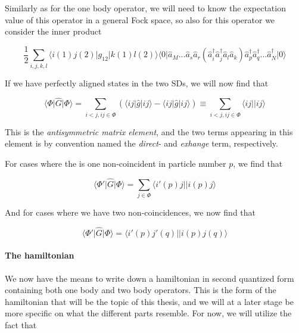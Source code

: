 Similarly as for the one body operator, we will need to know the expectation value of this operator in a general Fock space, so also for this operator we consider the inner product

\begin{equation}
 \frac{1}{2} \sum_{i,j,k,l}    \langle i(1) j(2) \vert g_{12} \vert k(1) l(2) \rangle \langle 0\vert  \hat{a}_M ...  \hat{a}_s  \hat{a}_r (\hat{a}_{i}^{\dagger}\hat{a}_{j}^{\dagger} \hat{a}_{l} \hat{a}_k)  \hat{a}_p^\dagger \hat{a}_q^\dagger  ... \hat{a}_N^\dagger \vert 0 \rangle
\label{eqn:sd12inner_op2}
\end{equation}

If we have perfectly aligned states in the two SDs, we will now find that

\begin{equation}
\langle \Phi \vert \hat{G} \vert \Phi \rangle = \sum_{i < j, ij \in \Phi} (\langle ij \vert \hat{g} \vert ij \rangle -   \langle ij \vert \hat{g} \vert ij \rangle) \equiv \sum_{i < j, ij \in \Phi}  \langle ij \vert \vert ij \rangle
\label{eqn:antisymmetric_element}
\end{equation}

This is the \emph{antisymmetric matrix element}, and the two terms appearing in this element is by convention named the \emph{direct}- and \emph{exhange} term, respectively. 

For cases where the is one non-coincident in particle number $p$, we find that

\begin{equation}
\langle \Phi' \vert \hat{G} \vert \Phi \rangle = \sum_{j \in \Phi} \langle i'(p) j \vert \vert i(p)j \rangle
\label{eqn:antisymmetric_element_2}
\end{equation}

And for cases where we have two non-coincidences, we now find that

\begin{equation}
\langle \Phi' \vert \hat{G} \vert \Phi \rangle = \langle i'(p) j'(q) \vert \vert i(p) j(q) \rangle
\label{eqn:antisymmetric_element_3}
\end{equation}

\paragraph{The hamiltonian}

We now have the means to write down a hamiltonian in second quantized form containing both one body and two body operators. This is the form of the hamiltonian that will be the topic of this thesis, and we will at a later stage be more specific on what the different parts resemble. For now, we will utilize the fact that

